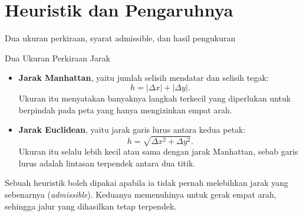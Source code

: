 \documentclass[aspectratio=169,10pt]{beamer}
\begin{document}
\section{Heuristik dan Pengaruhnya}
  {Dua ukuran perkiraan, syarat admissible, dan hasil pengukuran}

\begin{frame}{Dua Ukuran Perkiraan Jarak}
\begin{itemize}
  \item \textbf{Jarak Manhattan}, yaitu jumlah selisih mendatar dan selisih
        tegak:
        \[ h = |\Delta x| + |\Delta y| . \]
        Ukuran itu menyatakan banyaknya langkah terkecil yang diperlukan untuk
        berpindah pada peta yang hanya mengizinkan empat arah.
  \item \textbf{Jarak Euclidean}, yaitu jarak garis lurus antara kedua petak:
        \[ h = \sqrt{\Delta x^2 + \Delta y^2} . \]
        Ukuran itu selalu lebih kecil atau sama dengan jarak Manhattan, sebab
        garis lurus adalah lintasan terpendek antara dua titik.
\end{itemize}
\vspace{0.04cm}
\begin{kotak}
Sebuah heuristik boleh dipakai apabila ia tidak pernah melebihkan jarak yang
sebenarnya (\emph{admissible}). Keduanya memenuhinya untuk gerak empat arah,
sehingga jalur yang dihasilkan tetap terpendek.
\end{kotak}
\end{frame}
\end{document}
